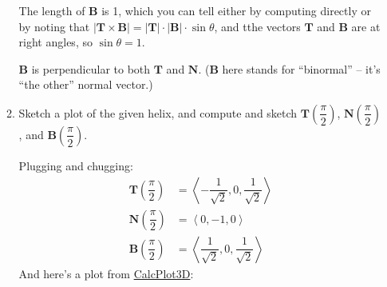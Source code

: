 \documentclass[10pt]{article}
\newcommand{\vT}{\mathbf{T}}
\newcommand{\vN}{\mathbf{N}}
\newcommand{\vB}{\mathbf{B}}
\newenvironment{red}{\color{red}}{\ignorespacesafterend}
\begin{document}
\begin{enumerate}[leftmargin=0pt]
\begin{enumerate}
    \begin{red}
        The length of $\vB$ is 1, which you can tell either by computing directly or by noting that $|\vT\times\vB| = |\vT| \cdot |\vB| \cdot \sin\theta$, and tthe vectors $\vT$ and $\vB$ are at right angles, so $\sin\theta = 1$.

        $\vB$ is perpendicular to both $\vT$ and $\vN$. ($\vB$ here stands for ``binormal'' -- it's ``the other'' normal vector.)
    \end{red}
    \item Sketch a plot of the given helix, and compute and sketch $\vT\left(\dfrac\pi2\right)$, $\vN\left(\dfrac\pi2\right)$, and $\vB\left(\dfrac\pi2\right)$.

    \begin{red}
        Plugging and chugging:
        \begin{align*}
            \vT\left(\dfrac\pi2\right) &= \left\langle
                -\dfrac{1}{\sqrt{2}}, 0, \dfrac{1}{\sqrt{2}}
                \right\rangle \\
            \vN\left(\dfrac\pi2\right) &= \left\langle
                0, -1, 0
                \right\rangle \\
            \vB\left(\dfrac\pi2\right) &= \left\langle
                \dfrac{1}{\sqrt{2}}, 0, \dfrac{1}{\sqrt{2}}
                \right\rangle
        \end{align*}
    And here's a plot from \href{https://c3d.libretexts.org/CalcPlot3D/index.html?type=spacecurve;spacecurve=curve;curvename=r_%7B1%7D;x=cos(t);y=sin(t);z=t;visible=true;width=2;view=0;tmin=0;tmax=pi;tsteps=500;color=rgb(255,0,0);showtrace=true;tval=pi/2;constcol=false;twod=false;arrows=0;showpt=true;traceptsize=4;trace=false;vel=false;acc=false;veceqs=true;osc=false;k=false;showtorsion=false;repeat=false;bounce=false;dashed=false;tanline=false;dropcurtain=false;showtnball=true;showtnb=true;showtnbeqs=true;showtnblabels=true;showoscplane=true;showrectplane=true;shownormplane=true;optimizecurve=true;maxjointangle=10&type=window;showfunnot=false;hsrmode=0;nomidpts=true;anaglyph=-1;center=8.236391035463326,4.755282581475768,3.0901699437494714,1;focus=0,0,0,1;up=-0.35224426555364663,-0.2033683215378999,0.913545457642601,1;transparent=false;alpha=140;twoviews=false;unlinkviews=false;axisextension=0.7;shownormals=false;shownormalsatpts=false;xaxislabel=x;yaxislabel=y;zaxislabel=z;edgeson=true;faceson=true;showbox=true;showaxes=true;showticks=true;perspective=true;centerxpercent=0.5;centerypercent=0.7500000000000002;rotationsteps=30;autospin=true;xygrid=false;yzgrid=false;xzgrid=false;gridsonbox=true;gridplanes=false;gridcolor=rgb(128,128,128);lastaddedsurfaceactive=true;disabletrace=false;activefun=-1;xmin=-2;xmax=2;ymin=-2;ymax=2;zmin=0;zmax=4;xscale=1;yscale=1;zscale=1;zcmin=-4;zcmax=4;xscalefactor=1;yscalefactor=1;zscalefactor=1;tracemode=0;keep2d=false;zoom=1.163529}{CalcPlot3D}:


\end{red}
\end{enumerate}
\end{enumerate}
\end{document}
